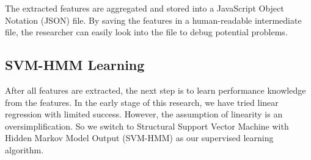    The extracted features are aggregated and stored into a JavaScript Object Notation (JSON) file. By saving the features in a human-readable intermediate file, the researcher can easily look into the file to debug potential problems.%


\subsection{SVM-HMM Learning}
After all features are extracted, the next step is to learn performance knowledge from the features. In the early stage of this research, we have tried linear regression with limited success\cite{Lyu2012}. However, the assumption of linearity is an oversimplification. So we switch to Structural Support Vector Machine with Hidden Markov Model Output (SVM-HMM)\cite{svm2009, svm2005, svm2003}  as our supervised learning algorithm. 

